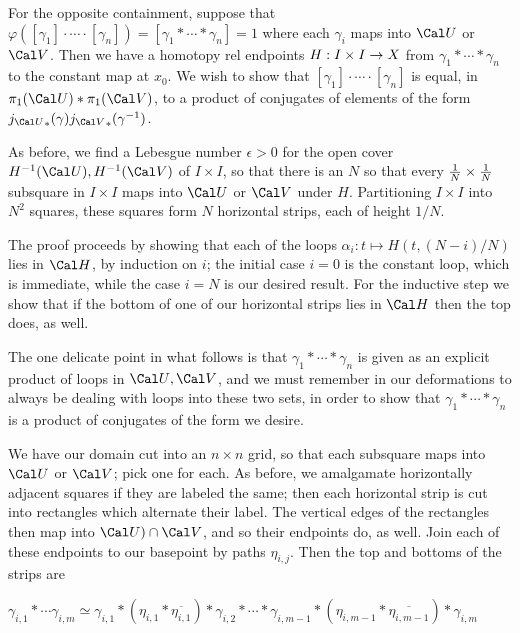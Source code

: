 \msk

For the opposite containment, suppose that
$\varphi([\gamma_1]\cdot \cdots \cdot [\gamma_n])=[\gamma_1*\cdots *\gamma_n]=1$
where each $\gamma_i$ maps into ${\Cal U}$ or ${\Cal V}$. Then we have a homotopy
rel endpoints $H:I\times I\rightarrow X$ from $\gamma_1*\cdots *\gamma_n$ to the constant
map at $x_0$. We wish to show that $[\gamma_1]\cdot \cdots \cdot [\gamma_n]$ is equal, 
in $\pi_1({\Cal U})*\pi_1({\Cal V})$, to a product of conjugates of elements of the 
form ${j_{\Cal U}}_*(\gamma){j_{\Cal V}}_*(\gamma^{-1})$. 

\msk

As before, we find a Lebesgue number $\epsilon >0$ for the open cover $H^{-1}({\Cal U}),H^{-1}({\Cal V})$ of $I\times I$,
so that there is an $N$ so that every ${{1}\over{N}}\times{{1}\over{N}}$ subsquare in $I\times I$ maps
into ${\Cal U}$ or ${\Cal V}$ under $H$. Partitioning $I\times I$ into $N^2$ squares, these squares form $N$ horizontal
strips, each of height $1/N$. 

\ssk

The proof proceeds by showing that each of the loops
$\alpha_i:t\mapsto H(t,(N-i)/N)$ lies in ${\Cal H}$, by induction on $i$; the initial case $i=0$ is the constant loop,
which is immediate, while the case $i=N$ is our desired result. For the inductive step we show that if the
bottom of one of our horizontal strips lies in ${\Cal H}$ then the top does, as well.

\msk

The one delicate point in what follows is that $\gamma_1*\cdots *\gamma_n$ is given as an explicit product of loops in 
${\Cal U},{\Cal V}$, and we must remember in our deformations to always be dealing with loops into these two sets, in 
order to show that     $\gamma_1*\cdots *\gamma_n$
is a product of conjugates of the form we desire. 
\vfill
\eject

We have our domain cut into an $n\times n$ grid, so that each subsquare maps into ${\Cal U}$ or ${\Cal V}$; pick one for 
each. As before, we amalgamate horizontally adjacent squares if they are labeled the same; then each horizontal strip
is cut into rectangles which alternate their label. The vertical edges of the rectangles then map into
${\Cal U})\cap{\Cal V}$, and so their endpoints do, as well. Join each of these endpoints to our basepoint by 
paths $\eta_{i,j}$. Then the top and bottoms of the strips are

$\gamma_{i,1}*\cdots \gamma_{i,m}\simeq 
\gamma_{i,1}*(\eta_{i,1}*\overline{\eta_{i,1}})*\gamma_{i,2}*\cdots *\gamma_{i,m-1}*(\eta_{i,m-1}*\overline{\eta_{i,m-1}})*\gamma_{i,m}$

